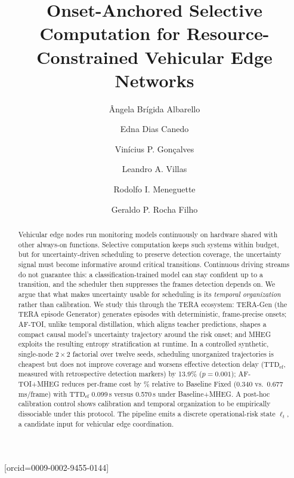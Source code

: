 \documentclass[a4paper,fleqn]{cas-dc}
\begin{document}
\title[mode=title]{Onset-Anchored Selective Computation for Resource-Constrained Vehicular Edge Networks}
\author[1]{{\^A}ngela Br\'igida Albarello}[orcid=0009-0002-9455-0144]
\cormark[1]
\author[1]{Edna Dias Canedo}
\author[1]{Vin\'icius P. Gon\c{c}alves}
\author[2]{Leandro A. Villas}
\author[3]{Rodolfo I. Meneguette}
\author[1,4]{Geraldo P. Rocha Filho}
\begin{abstract}
Vehicular edge nodes run monitoring models continuously on hardware shared
with other always-on functions. Selective computation keeps such systems within budget, but for uncertainty-driven scheduling to preserve detection
coverage, the uncertainty signal must become informative around critical
transitions. Continuous driving streams do not guarantee this: a
classification-trained model can stay confident up to a transition, and the
scheduler then suppresses the frames detection depends on.
We argue that what makes uncertainty usable for scheduling is its
\emph{temporal organization} rather than calibration. We study this through
the TERA ecosystem: \mbox{TERA-Gen} (the TERA episode Generator) generates
episodes with deterministic, frame-precise onsets; \mbox{AF-TOI}, unlike
temporal distillation, which aligns teacher predictions, shapes a compact
causal model's uncertainty trajectory around the risk onset; and \mbox{MHEG}
exploits the resulting entropy stratification at runtime. In a controlled
synthetic, single-node $2\times2$ factorial over twelve seeds, scheduling
unorganized trajectories is cheapest but does not improve coverage and
worsens effective detection delay ($\mathrm{TTD}_{\mathrm{ef}}$,
measured with retrospective detection markers) by
13.9\% ($p=0.001$); \mbox{AF-TOI}+MHEG reduces per-frame cost by
\CostReduction\% relative to Baseline Fixed (0.340 vs.\ 0.677\,ms/frame) with
$\mathrm{TTD}_{\mathrm{ef}}$ 0.099\,s versus 0.570\,s under Baseline+MHEG.
A post-hoc calibration control shows calibration and temporal organization
to be empirically dissociable under this protocol. The pipeline emits a discrete
operational-risk state $\ell_t$, a candidate input for vehicular edge
coordination.
\end{abstract}
\end{document}
